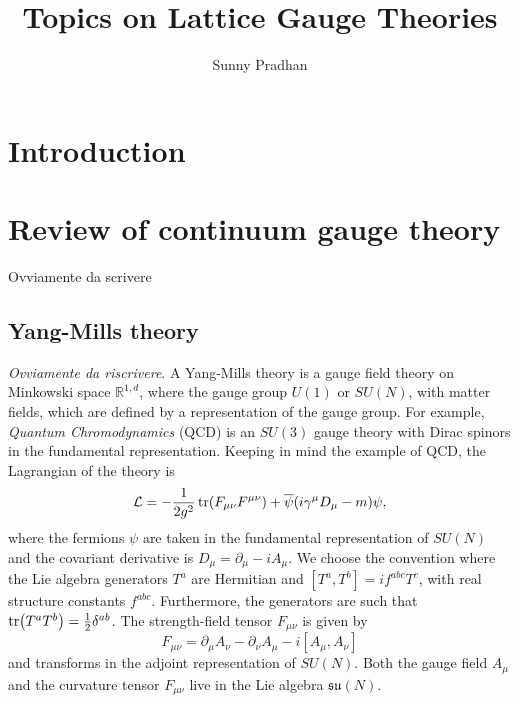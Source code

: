 \documentclass{book}
\author{Sunny Pradhan}
\title{Topics on Lattice Gauge Theories}
\date{}
\newcommand{\R}{\mathbb{R}}
\begin{document}
\maketitle

\tableofcontents


\chapter*{Introduction}
\label{chap:introduction}


\chapter{Review of continuum gauge theory}
\label{chap:review_of_continuum_gauge_theory}

Ovviamente da scrivere

\section{Yang-Mills theory}
\label{sec:yang_mills_theory}

\emph{Ovviamente da riscrivere}.
A Yang-Mills theory is a gauge field theory on Minkowski space $\R^{1,d}$, where the gauge group $U(1)$ or $SU(N)$, with matter fields, which are defined by a representation of the gauge group.
For example, \emph{Quantum Chromodynamics} (QCD) is an $SU(3)$ gauge theory with Dirac spinors in the fundamental representation.
Keeping in mind the example of QCD, the Lagrangian of the theory is
\begin{equation}
    \mathcal{L} = - \frac{1}{2 g^2} \tr(F_{\mu \nu} F^{\mu \nu}) + \overline{\psi} \qty( i \gamma^{\mu} D_{\mu} - m ) \psi,
\end{equation}
where the fermions $\psi$ are taken in the fundamental representation of $SU(N)$ and the covariant derivative is $D_{\mu} = \partial_{\mu} - i A_{\mu}$.
We choose the convention where the Lie algebra generators $T^a$ are Hermitian and $[T^a, T^b] = i f^{abc} T^c$, with real structure constants $f^{abc}$.
Furthermore, the generators are such that $\tr(T^a T^b) = \frac{1}{2} \delta^{ab}$.
The strength-field tensor $F_{\mu \nu}$ is given by
\begin{equation}
    F_{\mu \nu} = \partial_{\mu} A_{\nu} - \partial_{\nu} A_{\mu} - i [A_{\mu}, A_{\nu}]
\end{equation}
and transforms in the adjoint representation of $SU(N)$.
Both the gauge field $A_{\mu}$ and the curvature tensor $F_{\mu \nu}$ live in the Lie algebra $\mathfrak{su}(N)$.
\end{document}
